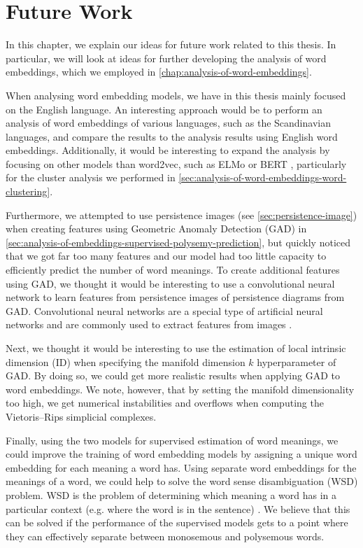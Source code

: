 \chapter{Future Work}
\label{chap:future-work}
In this chapter, we explain our ideas for future work related to this thesis. In particular, we will look at ideas for further developing the analysis of word embeddings, which we employed in \cref{chap:analysis-of-word-embeddings}.

When analysing word embedding models, we have in this thesis mainly focused on the English language. An interesting approach would be to perform an analysis of word embeddings of various languages, such as the Scandinavian languages, and compare the results to the analysis results using English word embeddings. Additionally, it would be interesting to expand the analysis by focusing on other models than word2vec, such as ELMo \cite{elmo2018} or BERT \cite{bert2019}, particularly for the cluster analysis we performed in \cref{sec:analysis-of-word-embeddings-word-clustering}.

Furthermore, we attempted to use persistence images (see \cref{sec:persistence-image}) when creating features using Geometric Anomaly Detection (GAD) in \cref{sec:analysis-of-embeddings-supervised-polysemy-prediction}, but quickly noticed that we got far too many features and our model had too little capacity to efficiently predict the number of word meanings. To create additional features using GAD, we thought it would be interesting to use a convolutional neural network to learn features from persistence images of persistence diagrams from GAD. Convolutional neural networks are a special type of artificial neural networks and are commonly used to extract features from images \cite[Chapter 8]{Aggarwal18}.

Next, we thought it would be interesting to use the estimation of local intrinsic dimension (ID) when specifying the manifold dimension $k$ hyperparameter of GAD. By doing so, we could get more realistic results when applying GAD to word embeddings. We note, however, that by setting the manifold dimensionality too high, we get numerical instabilities and overflows when computing the Vietoris–Rips simplicial complexes.

Finally, using the two models for supervised estimation of word meanings, we could improve the training of word embedding models by assigning a unique word embedding for each meaning a word has. Using separate word embeddings for the meanings of a word, we could help to solve the word sense disambiguation (WSD) problem. WSD is the problem of determining which meaning a word has in a particular context (e.g. where the word is in the sentence) \cite[p. 1-2]{AgirreEdmonds2006}. We believe that this can be solved if the performance of the supervised models gets to a point where they can effectively separate between monosemous and polysemous words.